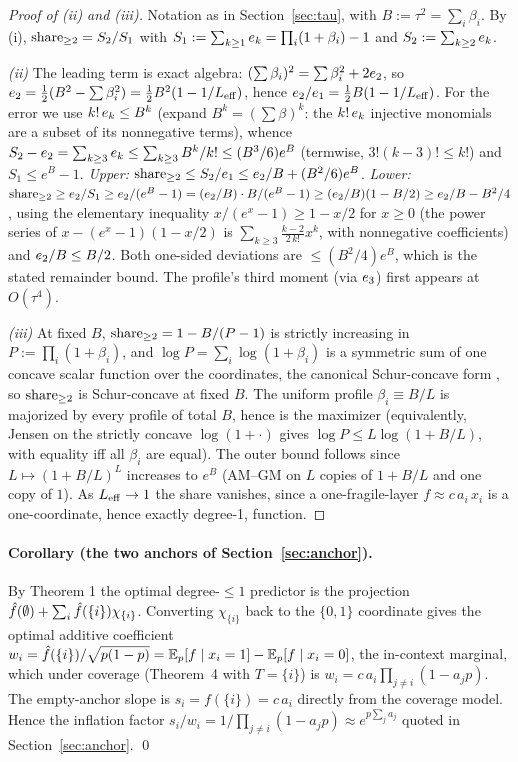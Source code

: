 \begin{proof}[Proof of \propfive(ii) and (iii)]
Notation as in Section~\ref{sec:tau}, with $B := \tau^2 = \sum_i\beta_i$. By \propfive(i),
$\mathrm{share}_{\ge 2} = S_2/S_1$ with $S_1 := \sum_{k\ge 1}e_{k} = \prod_i(1+\beta_i)-1$ and
$S_2 := \sum_{k\ge 2}e_{k}$.

\emph{(ii)} The leading term is exact algebra: $(\sum\beta_i)^2 = \sum\beta_i^2 + 2e_{2}$, so
$e_{2} = \tfrac12(B^2 - \sum\beta_i^2) = \tfrac12 B^2(1 - 1/L_{\mathrm{eff}})$, hence
$e_{2}/e_{1} = \tfrac12 B(1 - 1/L_{\mathrm{eff}})$. For the error we use $k!\,e_{k} \le B^k$ (expand
$B^k = (\sum\beta)^k$: the $k!\,e_{k}$ injective monomials are a subset of its nonnegative terms), whence
$S_2 - e_{2} = \sum_{k\ge 3}e_{k} \le \sum_{k\ge 3}B^k/k! \le (B^3/6)e^B$ (termwise,
$3!(k-3)! \le k!$) and $S_1 \le e^B - 1$. \emph{Upper:}
$\mathrm{share}_{\ge 2} \le S_2/e_{1} \le e_{2}/B + (B^2/6)e^B$. \emph{Lower:}
$\mathrm{share}_{\ge 2} \ge e_{2}/S_1 \ge e_{2}/(e^B-1) = (e_{2}/B)\cdot B/(e^B-1) \ge (e_{2}/B)(1 - B/2)
\ge e_{2}/B - B^2/4$, using the elementary inequality $x/(e^x-1) \ge 1 - x/2$ for $x \ge 0$ (the power
series of $x - (e^x-1)(1-x/2)$ is $\sum_{k\ge 3}\frac{k-2}{2\,k!}x^k$, with nonnegative coefficients) and
$e_{2}/B \le B/2$. Both one-sided deviations are $\le (B^2/4)e^B$, which is the stated remainder bound.
The profile's third moment (via $e_{3}$) first appears at $O(\tau^4)$.

\emph{(iii)} At fixed $B$, $\mathrm{share}_{\ge 2} = 1 - B/(P-1)$ is strictly increasing in
$P := \prod_i(1+\beta_i)$, and $\log P = \sum_i \log(1+\beta_i)$ is a symmetric sum of one concave scalar
function over the coordinates, the canonical Schur-concave form \citep{marshall2011majorization}, so
$\mathrm{share}_{\ge 2}$ is Schur-concave at fixed $B$. The uniform profile $\beta_i \equiv B/L$ is majorized by
every profile of total $B$, hence is the maximizer (equivalently, Jensen on the strictly concave
$\log(1+\cdot)$ gives $\log P \le L\log(1+B/L)$, with equality iff all $\beta_i$ are equal). The outer
bound follows since $L \mapsto (1+B/L)^L$ increases to $e^B$ (AM--GM on $L$ copies of $1+B/L$ and one
copy of $1$). As $L_{\mathrm{eff}} \to 1$ the share vanishes, since a one-fragile-layer $f \approx c\,a_i\,x_i$
is a one-coordinate, hence exactly degree-1, function.
\end{proof}

\paragraph{Corollary (the two anchors of Section~\ref{sec:anchor}).} By Theorem 1 the optimal degree-$\le 1$
predictor is the projection $\hat f(\emptyset) + \sum_i \hat f(\{i\})\chi_{\{i\}}$. Converting
$\chi_{\{i\}}$ back to the $\{0,1\}$ coordinate gives the optimal additive coefficient
$w_i = \hat f(\{i\})/\sqrt{p(1-p)} = \mathbb{E}_p[f\mid x_i=1] - \mathbb{E}_p[f\mid x_i=0]$, the in-context marginal, which
under coverage (Theorem~4 with $T=\{i\}$) is $w_i = c\,a_i\prod_{j\ne i}(1-a_jp)$. The empty-anchor
slope is $s_i = f(\{i\}) = c\,a_i$ directly from the coverage model. Hence the inflation factor
$s_i/w_i = 1/\prod_{j\ne i}(1-a_jp) \approx e^{p\sum_j a_j}$ quoted in Section~\ref{sec:anchor}. \qed

